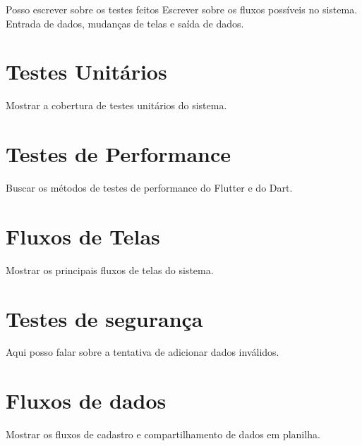 
\label{Cap:ExperimentosResultados}

Posso escrever sobre os testes feitos
Escrever sobre os fluxos possíveis no sistema. Entrada de dados, mudanças de telas e saída de dados.

\section{Testes Unitários}
\label{cap5:Sec:TestesUnitarios}
Mostrar a cobertura de testes unitários do sistema.

\section{Testes de Performance}
\label{cap5:Sec:TestesPerformance}
Buscar os métodos de testes de performance do Flutter e do Dart.

\section{Fluxos de Telas}
\label{cap5:Sec:FluxosTelas}
Mostrar os principais fluxos de telas do sistema.

\section{Testes de segurança}
\label{cap5:Sec:TestesSeguranca}
Aqui posso falar sobre a tentativa de adicionar dados inválidos.

\section{Fluxos de dados}
\label{Sec:FluxosDados}
Mostrar os fluxos de cadastro e compartilhamento de dados em planilha.




